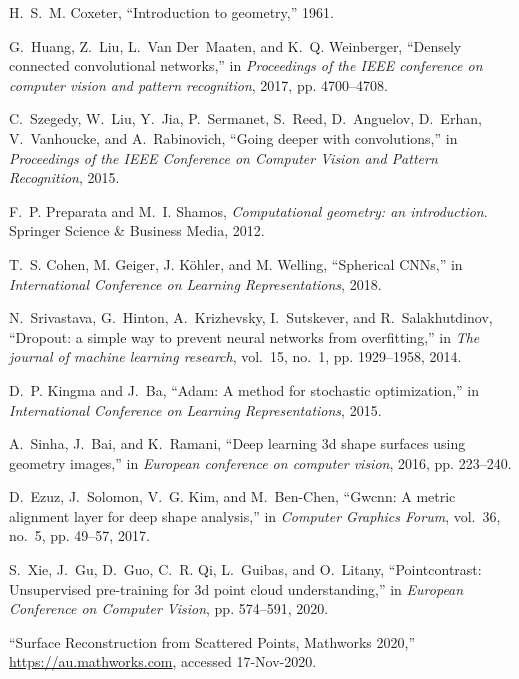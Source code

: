 \begin{thebibliography}{1}
H.~S.~M. Coxeter, ``Introduction to geometry,'' 1961.

G.~Huang, Z.~Liu, L.~Van Der~Maaten, and K.~Q. Weinberger, ``Densely connected
  convolutional networks,'' in \emph{Proceedings of the IEEE conference on
  computer vision and pattern recognition}, 2017, pp. 4700--4708.

C.~Szegedy, W.~Liu, Y.~Jia, P.~Sermanet, S.~Reed, D.~Anguelov, D.~Erhan,
  V.~Vanhoucke, and A.~Rabinovich, ``Going deeper with convolutions,'' in
  \emph{Proceedings of the IEEE Conference on Computer Vision and Pattern
  Recognition}, 2015.

F.~P. Preparata and M.~I. Shamos, \emph{Computational geometry: an
  introduction}. Springer Science \&
  Business Media, 2012.

T.~S. Cohen, M. Geiger, J. K{\"o}hler, and M. Welling,
  ``Spherical CNNs,'' in \emph{International Conference on Learning Representations}, 2018.

N.~Srivastava, G.~Hinton, A.~Krizhevsky, I.~Sutskever, and R.~Salakhutdinov,
  ``Dropout: a simple way to prevent neural networks from overfitting,'' in 
  \emph{The journal of machine learning research}, vol.~15, no.~1, pp.
  1929--1958, 2014.

D.~P. Kingma and J.~Ba, ``Adam: A method for stochastic optimization,''
 in \emph{International Conference on Learning Representations}, 2015.

A.~Sinha, J.~Bai, and K.~Ramani, ``Deep learning 3d shape surfaces using
  geometry images,'' in \emph{European conference on computer vision}, 2016, pp. 223--240.

D.~Ezuz, J.~Solomon, V.~G. Kim, and M.~Ben-Chen, ``Gwcnn: A metric alignment
  layer for deep shape analysis,'' in \emph{Computer Graphics Forum}, vol.~36,
  no.~5, pp.
  49--57, 2017.

S.~Xie, J.~Gu, D.~Guo, C.~R. Qi, L.~Guibas, and O.~Litany, ``Pointcontrast:
  Unsupervised pre-training for 3d point cloud understanding,'' in
  \emph{European Conference on Computer Vision}, pp. 574--591, 2020.

``{Surface Reconstruction from Scattered Points, Mathworks 2020},''
  \url{https://au.mathworks.com}, accessed 17-Nov-2020.


\end{thebibliography}
